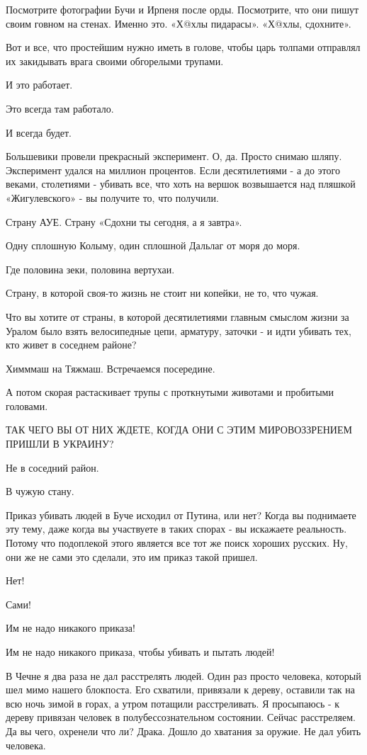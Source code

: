Посмотрите фотографии Бучи и Ирпеня после орды. Посмотрите, что они пишут своим
говном на стенах. Именно это. «Х@хлы пидарасы». «Х@хлы, сдохните». 

Вот и все, что простейшим нужно иметь в голове, чтобы царь толпами отправлял их
закидывать врага своими обгорелыми трупами. 

И это работает. 

Это всегда там работало. 

И всегда будет. 

Большевики провели прекрасный эксперимент. О, да. Просто снимаю шляпу.
Эксперимент удался на миллион процентов. Если десятилетиями - а до этого
веками, столетиями - убивать все, что хоть на вершок возвышается над пляшкой
«Жигулевского» - вы получите то, что получили. 

Страну АУЕ. Страну «Сдохни ты сегодня, а я завтра». 

Одну сплошную Колыму, один сплошной Дальлаг от моря до моря. 

Где половина зеки, половина вертухаи.

Страну, в которой своя-то жизнь не стоит ни копейки, не то, что чужая. 

Что вы хотите от страны, в которой десятилетиями главным смыслом жизни за
Уралом было взять велосипедные цепи, арматуру, заточки - и идти убивать тех,
кто живет в соседнем районе? 

Химммаш на Тяжмаш. Встречаемся посередине. 

А потом скорая растаскивает трупы с проткнутыми животами и пробитыми головами. 

ТАК ЧЕГО ВЫ ОТ НИХ ЖДЕТЕ, КОГДА ОНИ С ЭТИМ МИРОВОЗЗРЕНИЕМ ПРИШЛИ В УКРАИНУ?

Не в соседний район.

В чужую стану.

Приказ убивать людей в Буче исходил от Путина, или нет? Когда вы поднимаете эту
тему, даже когда вы участвуете в таких спорах - вы искажаете реальность. Потому
что подоплекой этого является все тот же поиск хороших русских. Ну, они же не
сами это сделали, это им приказ такой пришел.

Нет! 

Сами! 

Им не надо никакого приказа!

Им не надо никакого приказа, чтобы убивать и пытать людей!

В Чечне я два раза не дал расстрелять людей. Один раз просто человека, который
шел мимо нашего блокпоста. Его схватили, привязали к дереву, оставили так на
всю ночь зимой в горах, а утром потащили расстреливать. Я просыпаюсь - к дереву
привязан человек в полубессознательном состоянии. Сейчас расстреляем. Да вы
чего, охренели что ли? Драка. Дошло до хватания за оружие. Не дал убить
человека.

